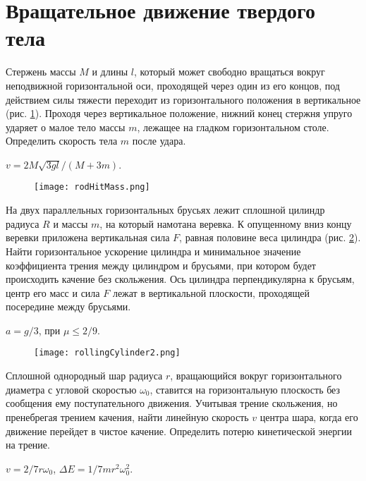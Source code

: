 \section{Вращательное движение твердого тела}

\introProblems

\begin{ex} %
Стержень массы $M$ и длины $l$, который может свободно вращаться вокруг неподвижной горизонтальной оси, проходящей через один из его концов, под действием силы тяжести переходит из горизонтального положения в вертикальное (рис. \ref{rodHitMass}). Проходя через вертикальное положение, нижний конец стержня упруго ударяет о малое тело массы $m$, лежащее на гладком горизонтальном столе. Определить скорость тела $m$ после удара.
\begin{ans}
$v = 2M\sqrt{3gl}/(M+3m)$.
\end{ans}
\end{ex}	

\begin{figure}[h]
\centering
\texttt{[image: rodHitMass.png]}
\caption{}
\label{rodHitMass}
\end{figure}

\begin{ex} %
На двух параллельных горизонтальных брусьях лежит сплошной цилиндр радиуса $R$ и массы $m$, на который намотана веревка. К опущенному вниз концу веревки приложена вертикальная сила $F$, равная половине веса цилиндра (рис. \ref{rollingCylinder2}). Найти горизонтальное ускорение цилиндра и минимальное значение коэффициента трения между цилиндром и брусьями, при котором будет происходить качение без скольжения. Ось цилиндра перпендикулярна к брусьям, центр его масс и сила $F$ лежат в вертикальной плоскости, проходящей посередине между брусьями.
\begin{ans}
$a = g/3$, при $\mu \leq 2/9$.
\end{ans}
\end{ex}	

\begin{figure}[h]
\centering
\texttt{[image: rollingCylinder2.png]}
\caption{}
\label{rollingCylinder2}
\end{figure}

\begin{ex} %
Сплошной однородный шар радиуса $r$, вращающийся вокруг горизонтального диаметра с угловой скоростью $\omega_0$, ставится на горизонтальную плоскость без сообщения ему поступательного движения. Учитывая трение скольжения, но пренебрегая трением качения, найти линейную скорость $v$ центра шара, когда его движение перейдет в чистое качение. Определить потерю кинетической энергии на трение.
\begin{ans}
$v = 2/7r \omega_0$, $\Delta E = 1/7 mr^2 \omega_0^2$.
\end{ans}
\end{ex}	

